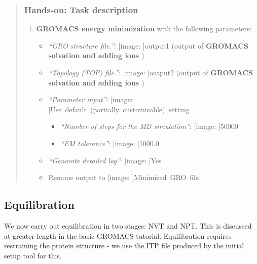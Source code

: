 \documentclass[twocolumn]{bmcart}%
\def\texttt{[image: ]}
\providecommand{\tightlist}{%
  \setlength{\itemsep}{0pt}\setlength{\parskip}{0pt}}
\begin{document}
\begin{quote}
\hypertarget{hands-on-task-description-5}{%
\subsubsection{Hands-on: Task
description}\label{hands-on-task-description-5}}

\begin{enumerate}
\def\labelenumi{\arabic{enumi}.}
\tightlist
\item
  \textbf{GROMACS energy minimization} with the following parameters:

  \begin{itemize}
  \tightlist
  \item
    \emph{``GRO structure file.''}: \texttt{output1} (output of
    \textbf{GROMACS solvation and adding ions} )
  \item
    \emph{``Topology (TOP) file.''}: \texttt{output2} (output of
    \textbf{GROMACS solvation and adding ions} )
  \item
    \emph{``Parameter input''}:
    \texttt{Use\ default\ (partially\ customisable)\ setting}

    \begin{itemize}
    \tightlist
    \item
      \emph{``Number of steps for the MD simulation''}: \texttt{50000}
    \item
      \emph{``EM tolerance''}: \texttt{1000.0}
    \end{itemize}
  \item
    \emph{``Generate detailed log''}: \texttt{Yes}
  \item
    Rename output to \texttt{Minimized\ GRO\ file}
  \end{itemize}
\end{enumerate}


\end{quote}

\hypertarget{equilibration}{%
\subsection{Equilibration}\label{equilibration}}

We now carry out equilibration in two stages: NVT and NPT. This is
discussed at greater length in the basic GROMACS tutorial. Equilibration
requires restraining the protein structure - we use the ITP file
produced by the initial setup tool for this.
\end{document}
